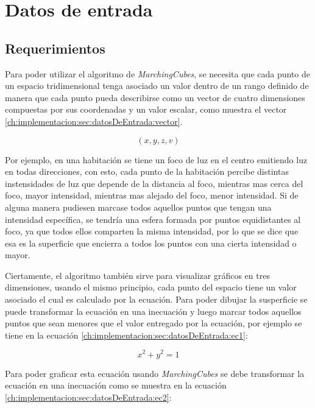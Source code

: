 \section{Datos de entrada}
\label{ch:implementacion:sec:datosDeEntrada}

\subsection{Requerimientos}
\label{ch:implementacion:sec:datosDeEntrada:subsec:requerimientos}

Para poder utilizar el algoritmo de \emph{MarchingCubes}, se necesita que cada punto de un espacio tridimensional tenga asociado un valor dentro de un rango definido de manera que cada punto pueda describirse como un vector de cuatro dimensiones compuestas por sus coordenadas y un valor escalar, como muestra el vector \ref{ch:implementacion:sec:datosDeEntrada:vector}.

\begin{equation}
\label{ch:implementacion:sec:datosDeEntrada:vector}
	(x,y,z,v)
\end{equation}

Por ejemplo, en una habitación se tiene un foco de luz en el centro emitiendo luz en todas direcciones, con esto, cada punto de la habitación percibe distintas instensidades de luz que depende de la distancia al foco, mientras mas cerca del foco, mayor intensidad, mientras mas alejado del foco, menor intensidad. Si de alguna manera pudiesen marcase todos aquellos puntos que tengan una intensidad específica, se tendría una esfera formada por puntos equidistantes al foco, ya que todos ellos comparten la misma intensidad, por lo que se dice que esa es la superficie que encierra a todos los puntos con una cierta intensidad o mayor.

Ciertamente, el algoritmo también sirve para visualizar gráficos en tres dimensiones, usando el mismo principio, cada punto del espacio tiene un valor asociado el cual es calculado por la ecuación. Para poder dibujar la susperficie se puede transformar la ecuación en una inecuación y luego marcar todos aquellos puntos que sean menores que el valor entregado por la ecuación, por ejemplo se tiene en la ecuación \ref{ch:implementacion:sec:datosDeEntrada:ec1}:

\begin{equation}
\label{ch:implementacion:sec:datosDeEntrada:ec1}
	x^{2} + y^{2} = 1
\end{equation}

Para poder graficar esta ecuación usando \emph{MarchingCubes} se debe transformar la ecuación en una inecuación como se muestra en la ecuación \ref{ch:implementacion:sec:datosDeEntrada:ec2}:

